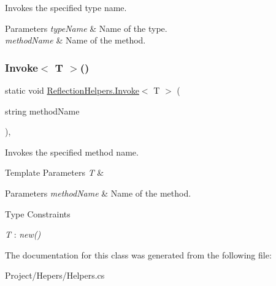 Invokes the specified type name. 


\begin{DoxyParams}{Parameters}
{\em type\+Name} & Name of the type.\\
\hline
{\em method\+Name} & Name of the method.\\
\hline
\end{DoxyParams}
\mbox{\label{class_reflection_helpers_a061fa976e2978c0446f68c012e9aef62}} 
\subsubsection{\texorpdfstring{Invoke$<$ T $>$()}{Invoke< T >()}}
{\footnotesize\ttfamily static void \hyperlink{class_reflection_helpers_a5882e880330b999887bc73ec4c012cdc}{Reflection\+Helpers.\+Invoke}$<$ T $>$ (\begin{DoxyParamCaption}\item[{string}]{method\+Name }\end{DoxyParamCaption})\hspace{0.3cm}{\ttfamily [inline]}, {\ttfamily [static]}}



Invokes the specified method name. 


\begin{DoxyTemplParams}{Template Parameters}
{\em T} & \\
\hline
\end{DoxyTemplParams}

\begin{DoxyParams}{Parameters}
{\em method\+Name} & Name of the method.\\
\hline
\end{DoxyParams}
\begin{Desc}
\item[Type Constraints]\begin{description}
\item[{\em T} : {\em new()}]\end{description}
\end{Desc}


The documentation for this class was generated from the following file\+:\begin{DoxyCompactItemize}
\item 
Project/\+Hepers/Helpers.\+cs\end{DoxyCompactItemize}
